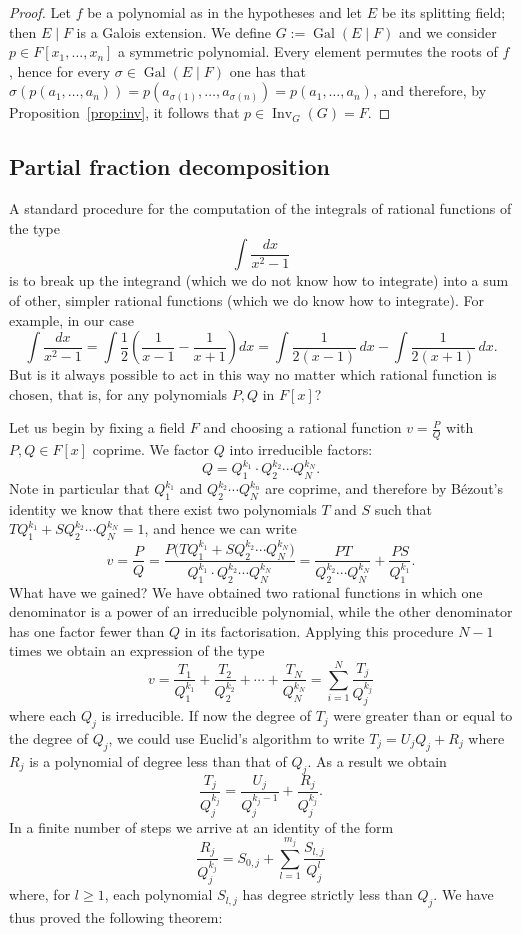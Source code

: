 \documentclass[11pt]{article}
\theoremstyle{plain}
\theoremstyle{definition}
\theoremstyle{remark}
\newcommand{\Gal}{\operatorname{Gal}}
\newcommand{\Inv}{\operatorname{Inv}}
\begin{document}
\begin{proof}
Let $f$ be a polynomial as in the hypotheses and let $E$ be its
splitting field; then $E\mid F$ is a Galois extension. We define
$G := \Gal(E\mid F)$ and we consider $p \in F[x_{1}, \ldots, x_{n}]$ a
symmetric polynomial. Every element permutes the roots of $f$, hence
for every $\sigma \in \Gal(E\mid F)$ one has that
$\sigma(p(a_{1}, \ldots, a_{n})) = p(a_{\sigma(1)}, \ldots,
a_{\sigma(n)}) = p(a_{1}, \ldots, a_{n})$, and therefore, by
Proposition~\ref{prop:inv}, it follows that
$p \in \Inv_{G}(G) = F$.
\end{proof}

\subsection*{Partial fraction decomposition}
A standard procedure for the computation of the integrals of rational
functions of the type
\[
\int \frac{dx}{x^{2}-1}
\]
is to break up the integrand (which we do not know how to integrate)
into a sum of other, simpler rational functions (which we do know how
to integrate). For example, in our case
\[
\int \frac{dx}{x^{2}-1}
= \int \frac{1}{2}\left( \frac{1}{x-1} - \frac{1}{x+1} \right) dx
= \int \frac{1}{2(x-1)}\, dx - \int \frac{1}{2(x+1)}\, dx.
\]
But is it always possible to act in this way no matter which rational
function is chosen, that is, for any polynomials $P, Q$ in $F[x]$?

Let us begin by fixing a field $F$ and choosing a rational function
$v = \frac{P}{Q}$ with $P, Q \in F[x]$ coprime. We factor $Q$ into
irreducible factors:
\[
Q = Q_{1}^{k_{1}} \cdot Q_{2}^{k_{2}} \cdots Q_{N}^{k_{N}}.
\]
Note in particular that $Q_{1}^{k_{1}}$ and
$Q_{2}^{k_{2}} \cdots Q_{N}^{k_{n}}$ are coprime, and therefore by
B\'ezout's identity we know that there exist two polynomials $T$ and
$S$ such that $T Q_{1}^{k_{1}} + S Q_{2}^{k_{2}} \cdots Q_{N}^{k_{N}} =
1$, and hence we can write
\[
v = \frac{P}{Q}
= \frac{P\bigl(T Q_{1}^{k_{1}} + S Q_{2}^{k_{2}} \cdots
Q_{N}^{k_{N}}\bigr)}{Q_{1}^{k_{1}} \cdot Q_{2}^{k_{2}} \cdots
Q_{N}^{k_{N}}}
= \frac{P T}{Q_{2}^{k_{2}} \cdots Q_{N}^{k_{N}}}
+ \frac{P S}{Q_{1}^{k_{1}}}.
\]
What have we gained? We have obtained two rational functions in which
one denominator is a power of an irreducible polynomial, while the
other denominator has one factor fewer than $Q$ in its factorisation.
Applying this procedure $N-1$ times we obtain an expression of the type
\[
v = \frac{T_{1}}{Q_{1}^{k_{1}}} + \frac{T_{2}}{Q_{2}^{k_{2}}}
+ \cdots + \frac{T_{N}}{Q_{N}^{k_{N}}}
= \sum_{i=1}^{N} \frac{T_{j}}{Q_{j}^{k_{j}}}
\]
where each $Q_{j}$ is irreducible. If now the degree of $T_{j}$ were
greater than or equal to the degree of $Q_{j}$, we could use Euclid's
algorithm to write $T_{j} = U_{j} Q_{j} + R_{j}$ where $R_{j}$ is a
polynomial of degree less than that of $Q_{j}$. As a result we obtain
\[
\frac{T_{j}}{Q_{j}^{k_{j}}}
= \frac{U_{j}}{Q_{j}^{k_{j}-1}} + \frac{R_{j}}{Q_{j}^{k_{j}}}.
\]
In a finite number of steps we arrive at an identity of the form
\[
\frac{R_{j}}{Q_{j}^{k_{j}}}
= S_{0,j} + \sum_{l=1}^{m_{j}} \frac{S_{l,j}}{Q_{j}^{l}}
\]
where, for $l \ge 1$, each polynomial $S_{l,j}$ has degree strictly
less than $Q_{j}$. We have thus proved the following theorem:
\end{document}
